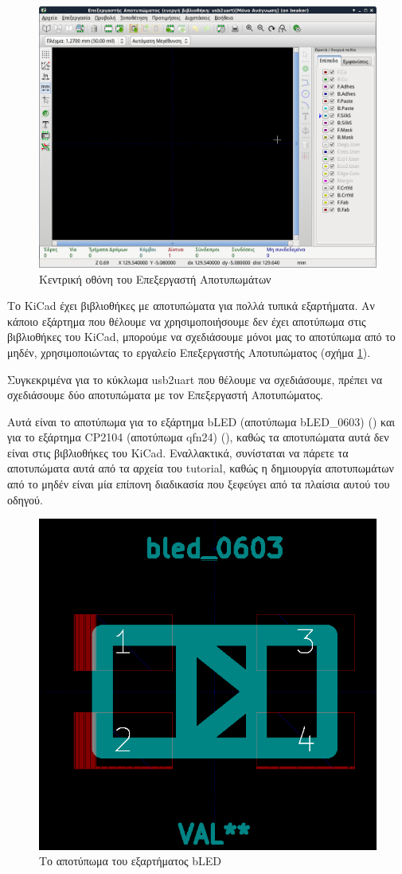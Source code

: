 \documentclass[a4paper]{article}
\begin{document}
\begin{figure}
  \begin{center}
    \includegraphics[width=.9\textwidth]{img/footed-main-wind.png}
    \caption{Κεντρική οθόνη του Επεξεργαστή Αποτυπωμάτων}
    \label{fig:footed-main-wind}
  \end{center}
\end{figure}

Το \textenglish{KiCad} έχει βιβλιοθήκες με αποτυπώματα για πολλά τυπικά εξαρτήματα. Αν κάποιο εξάρτημα που θέλουμε να χρησιμοποιήσουμε δεν έχει αποτύπωμα στις βιβλιοθήκες του \textenglish{KiCad}, μπορούμε να σχεδιάσουμε μόνοι μας το αποτύπωμα από το μηδέν, χρησιμοποιώντας το εργαλείο Επεξεργαστής Αποτυπώματος (σχήμα \ref{fig:footed-main-wind}).

Συγκεκριμένα για το κύκλωμα usb2uart που θέλουμε να σχεδιάσουμε, πρέπει να σχεδιάσουμε δύο αποτυπώματα με τον Επεξεργαστή Αποτυπώματος.

Αυτά είναι το αποτύπωμα για το εξάρτημα bLED (αποτύπωμα bLED\_0603) (\label{fig:footed-circ-bled}) και για το εξάρτημα CP2104 (αποτύπωμα qfn24) (\label{fig:footed-circ-cp}), καθώς τα αποτυπώματα αυτά δεν είναι στις βιβλιοθήκες του \textenglish{KiCad}. Εναλλακτικά, συνίσταται να πάρετε τα αποτυπώματα αυτά από τα αρχεία του tutorial, καθώς η δημιουργία αποτυπωμάτων από το μηδέν είναι μία επίπονη διαδικασία που ξεφεύγει από τα πλαίσια αυτού του οδηγού.


\begin{figure}
  \begin{center}
    \includegraphics[width=.5\textwidth]{img/footed-circ-bled.png}
    \caption{Το αποτύπωμα του εξαρτήματος bLED}
    \label{fig:footed-circ-bled}
  \end{center}
\end{figure}
\end{document}
